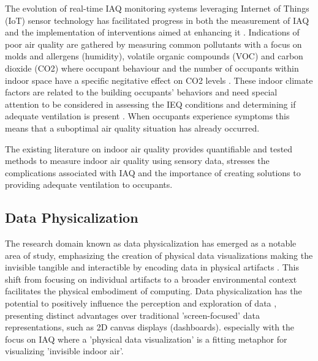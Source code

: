 The evolution of real-time IAQ monitoring systems leveraging Internet of Things (IoT) sensor technology has facilitated progress in both the measurement of IAQ and the implementation of interventions aimed at enhancing it \cite{pantelic_transformational_2022}. Indications of poor air quality are gathered by measuring common pollutants with a focus on molds and allergens (humidity), volatile organic compounds (VOC) and carbon dioxide (CO2) \cite{klepeis_national_2001} where occupant behaviour and the number of occupants within indoor space have a specific negitative effect on CO2 levels \cite{fromme_indoor_2023}. These indoor climate factors are related to the building occupants’ behaviors and need special attention to be considered in assessing the IEQ conditions and determining if adequate ventilation is present \cite{du_indoor_2020}. When occupants experience symptoms this means that a suboptimal air quality situation has already occurred. 

The existing literature on indoor air quality provides quantifiable and tested methods to measure indoor air quality using sensory data, stresses the complications associated with IAQ and the importance of creating solutions to providing adequate ventilation to occupants. 


\subsection{Data Physicalization}

The research domain known as data physicalization \cite{alexander_data_2019} has emerged as a notable area of study, emphasizing the creation of physical data visualizations making the invisible tangible and interactible by encoding data in physical artifacts \cite{ranasinghe_encoding_2023}. This shift from focusing on individual artifacts to a broader environmental context facilitates the physical embodiment of computing. Data physicalization has the potential to positively influence the perception and exploration of data \cite{jansen_opportunities_2015}, presenting distinct advantages over traditional 'screen-focused' data representations, such as 2D canvas displays (dashboards). \cite{hornecker_design_2023} especially with the focus on IAQ where a 'physical data visualization' is a fitting metaphor for visualizing 'invisible indoor air'.

